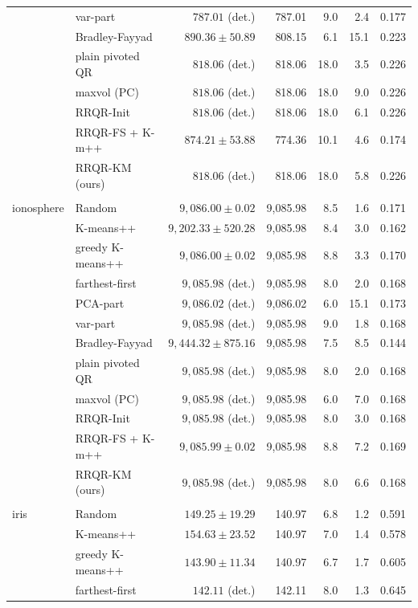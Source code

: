 \begin{table}[htbp]
{\begin{tabular}{llrrrrr}
 & var-part & $787.01$ (det.) & 787.01 & 9.0 & 2.4 & 0.177 \\
 & Bradley-Fayyad & $890.36 \pm 50.89$ & 808.15 & 6.1 & 15.1 & 0.223 \\
 & plain pivoted QR & $818.06$ (det.) & 818.06 & 18.0 & 3.5 & 0.226 \\
 & maxvol (PC) & $818.06$ (det.) & 818.06 & 18.0 & 9.0 & 0.226 \\
 & RRQR-Init & $818.06$ (det.) & 818.06 & 18.0 & 6.1 & 0.226 \\
 & RRQR-FS + K-m++ & $874.21 \pm 53.88$ & 774.36 & 10.1 & 4.6 & 0.174 \\
 & RRQR-KM (ours) & $818.06$ (det.) & 818.06 & 18.0 & 5.8 & 0.226 \\
\addlinespace \\
ionosphere & Random & $9,086.00 \pm 0.02$ & 9,085.98 & 8.5 & 1.6 & 0.171 \\
 & K-means++ & $9,202.33 \pm 520.28$ & 9,085.98 & 8.4 & 3.0 & 0.162 \\
 & greedy K-means++ & $9,086.00 \pm 0.02$ & 9,085.98 & 8.8 & 3.3 & 0.170 \\
 & farthest-first & $9,085.98$ (det.) & 9,085.98 & 8.0 & 2.0 & 0.168 \\
 & PCA-part & $9,086.02$ (det.) & 9,086.02 & 6.0 & 15.1 & 0.173 \\
 & var-part & $9,085.98$ (det.) & 9,085.98 & 9.0 & 1.8 & 0.168 \\
 & Bradley-Fayyad & $9,444.32 \pm 875.16$ & 9,085.98 & 7.5 & 8.5 & 0.144 \\
 & plain pivoted QR & $9,085.98$ (det.) & 9,085.98 & 8.0 & 2.0 & 0.168 \\
 & maxvol (PC) & $9,085.98$ (det.) & 9,085.98 & 6.0 & 7.0 & 0.168 \\
 & RRQR-Init & $9,085.98$ (det.) & 9,085.98 & 8.0 & 3.0 & 0.168 \\
 & RRQR-FS + K-m++ & $9,085.99 \pm 0.02$ & 9,085.98 & 8.8 & 7.2 & 0.169 \\
 & RRQR-KM (ours) & $9,085.98$ (det.) & 9,085.98 & 8.0 & 6.6 & 0.168 \\
\addlinespace \\
iris & Random & $149.25 \pm 19.29$ & 140.97 & 6.8 & 1.2 & 0.591 \\
 & K-means++ & $154.63 \pm 23.52$ & 140.97 & 7.0 & 1.4 & 0.578 \\
 & greedy K-means++ & $143.90 \pm 11.34$ & 140.97 & 6.7 & 1.7 & 0.605 \\
 & farthest-first & $142.11$ (det.) & 142.11 & 8.0 & 1.3 & 0.645 \\

\end{tabular}}
\end{table}
